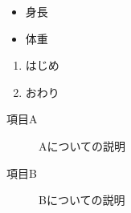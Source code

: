 \documentclass[12pt]{jarticle}
\begin{document}
\begin{itemize}
\item 身長
\item 体重
\end{itemize}
\begin{enumerate}
\item はじめ
\item おわり
\end{enumerate}
\begin{description}
\item[項目A] Aについての説明
\item[項目B] Bについての説明
\end{description}
\end{document}
